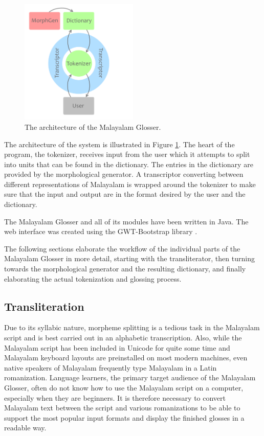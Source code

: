 \documentclass[a4paper]{article}
\begin{document}
\begin{figure}[t]
\centering
\includegraphics[width=0.5\textwidth]{systemarchitecture.png}
\caption{The architecture of the Malayalam Glosser.}
\label{architecture}
\end{figure}

The architecture of the system is illustrated in Figure \ref{architecture}. The heart of the program, the tokenizer, receives input from the user which it attempts to split into units that can be found in the dictionary. The entries in the dictionary are provided by the morphological generator. A transcriptor converting between different representations of Malayalam is wrapped around the tokenizer to make sure that the input and output are in the format desired by the user and the dictionary.

The Malayalam Glosser and all of its modules have been written in Java. The web interface was created using the GWT-Bootstrap library \parencite{gwtbootstrap}.

The following sections elaborate the workflow of the individual parts of the Malayalam Glosser in more detail, starting with the transliterator, then turning towards the morphological generator and the resulting dictionary, and finally elaborating the actual tokenization and glossing process.

\subsection{Transliteration}

Due to its syllabic nature, morpheme splitting is a tedious task in the Malayalam script and is best carried out in an alphabetic transcription. Also, while the Malayalam script has been included in Unicode for quite some time and Malayalam keyboard layouts are preinstalled on most modern machines, even native speakers of Malayalam frequently type Malayalam in a Latin romanization. Language learners, the primary target audience of the Malayalam Glosser, often do not know how to use the Malayalam script on a computer, especially when they are beginners. It is therefore necessary to convert Malayalam text between the script and various romanizations to be able to support the most popular input formats and display the finished glosses in a readable way.
\end{document}
